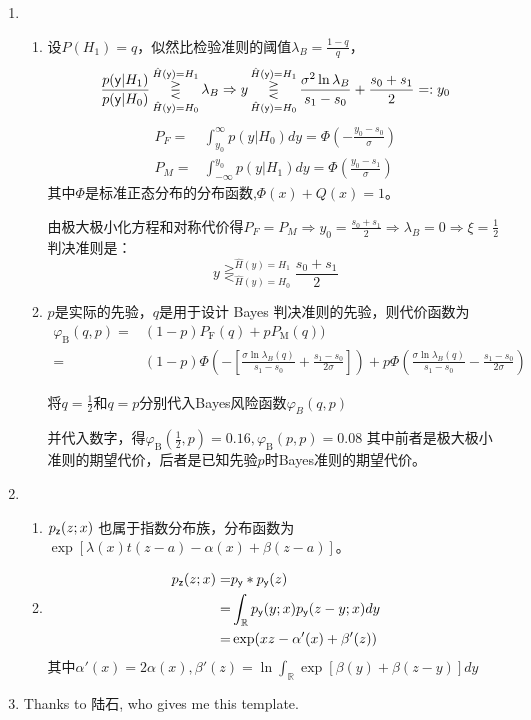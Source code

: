 \documentclass[a4paper]{article}
\begin{document}
\begin{enumerate}[label=\thehwcnt.\arabic*.]
\begin{enumerate}[label=(\alph*)]
  \end{enumerate} 
  \item
  \begin{enumerate}[label=(\alph*)]
  \item 
  设$P(H_1)=q$，似然比检验准则的阈值$\lambda_B=\frac{1-q}{q}$，
$$
\frac{p(\mathsf{y}|H_1)}{p(\mathsf{y}|H_0)}\mathop{\gtreqless}_{\hat{H}(\mathsf{y})=H_0}^{\hat{H}(\mathsf{y})=H_1} \lambda_B
\Rightarrow y \mathop{\gtreqless}_{\hat{H}(\mathsf{y})=H_0}^{\hat{H}(\mathsf{y})=H_1} \frac{\sigma^2 \ln \lambda_B}{s_1-s_0}
+\frac{s_0+s_1}{2}=:y_0
$$
\begin{align*}
P_F = & \int_{y_0}^{\infty} p(y|H_0) dy = \Phi(-\frac{y_0-s_0}{\sigma}) \\
P_M = & \int_{-\infty}^{y_0} p(y|H_1) dy = \Phi(\frac{y_0-s_1}{\sigma})
\end{align*}
其中$\Phi$是标准正态分布的分布函数,$\Phi(x)+Q(x)=1$。

由极大极小化方程和对称代价得$P_F=P_M \Rightarrow y_0 =\frac{s_0+s_1}{2} \Rightarrow \lambda_B=0\Rightarrow \xi=\frac{1}{2}$
  判决准则是：
  $$
  y \mathop{\gtreqless}_{\hat{H}(y)=H_0}^{\hat{H}(y)=H_1} \frac{s_0+s_1}{2} 
  $$
  
  \item
  $p$是实际的先验，$q$是用于设计 Bayes 判决准则的先验，则代价函数为
  \begin{align}
  \varphi_{\mathrm{B}}(q,p) = & (1-p)P_{\mathrm{F}}(q)+p P_{\mathrm{M}}(q)) \\
  = & (1-p)\Phi(-[\frac{\sigma \ln \lambda_B(q)}{s_1-s_0}+\frac{s_1-s_0}{2\sigma}])+p \Phi(\frac{\sigma \ln \lambda_B(q)}{s_1-s_0}-\frac{s_1-s_0}{2\sigma})
  \end{align}

  将$q=\frac{1}{2}$和$q=p$分别代入Bayes风险函数$\varphi_B(q,p)$ 

  并代入数字，得$\varphi_{\mathrm{B}}(\frac{1}{2},p)=0.16,\varphi_{\mathrm{B}}(p,p)=0.08$
  其中前者是极大极小准则的期望代价，后者是已知先验$p$时Bayes准则的期望代价。
  \end{enumerate}
  \item 
   \begin{enumerate}[label=(\alph*)]
   \item $p_{\mathsf{z}}(z;x)$ 也属于指数分布族，分布函数为  $ \exp[\lambda(x)t(z-a)-\alpha(x)+\beta(z-a)] $。
   \item 
    \begin{align*}
    p_{\mathsf{z}}(z;x) = & p_{\mathsf{y}}* p_{\mathsf{y}}(z) \\
                  = & \int_{\mathbb{R}} p_{\mathsf{y}}(y;x)p_{\mathsf{y}}(z-y;x)dy \\
                  = & \exp(xz-\alpha'(x)+\beta'(z))
    \end{align*}
    其中$\alpha'(x)=2\alpha(x),\beta'(z)=\ln \int_{\mathbb{R}} \exp[\beta(y)+\beta(z-y)]dy$
    \end{enumerate}  

  \item Thanks to 陆石, who gives me this template.
  

  \end{enumerate}
\end{document}
